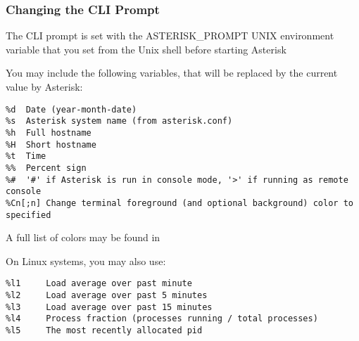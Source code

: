 \subsubsection{Changing the CLI Prompt}

The CLI prompt is set with the ASTERISK\_PROMPT UNIX environment variable that
you set from the Unix shell before starting Asterisk

You may include the following variables, that will be replaced by
the current value by Asterisk:

\begin{verbatim}
%d	Date (year-month-date)
%s	Asterisk system name (from asterisk.conf)
%h	Full hostname
%H	Short hostname
%t	Time
%%	Percent sign
%#	'#' if Asterisk is run in console mode, '>' if running as remote console
%Cn[;n]	Change terminal foreground (and optional background) color to specified
\end{verbatim}

A full list of colors may be found in 

On Linux systems, you may also use:

\begin{verbatim}
%l1     Load average over past minute
%l2     Load average over past 5 minutes
%l3     Load average over past 15 minutes
%l4     Process fraction (processes running / total processes)
%l5     The most recently allocated pid
\end{verbatim}
